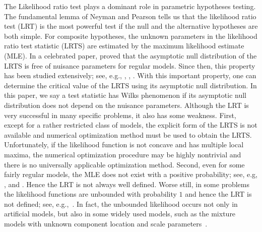\documentclass[11pt]{article}
\theoremstyle{plain}
\theoremstyle{definition}
\theoremstyle{remark}
\begin{document}
The Likelihood ratio test plays a dominant role in parametric hypotheses testing.
The fundamental lemma of Neyman and Pearson tells us that the likelihood ratio test (LRT) is the most powerful test if the null and the alternative hypotheses are both simple.
For composite hypotheses, the unknown parameters in the likelihood ratio test statistic (LRTS) are estimated by the maximum likelihood estimate (MLE).
In a celebrated paper, \citep{Wilks1938The} proved that the asymptotic null distribution of the LRTS is free of nuisance parameters for regular models.
Since then, this property has been studied extensively; see, e.g., \cite{Hogg1956On}, \cite{Fan2000}, \cite{Fan2001}.
With this important property, one can determine the critical value of the LRTS using its asymptotic null distribution.
In this paper, we say a test statistic has Wilks phenomenon if its asymptotic null distribution does not depend on the nuisance parameters.
Although the LRT is very successful in many specific problems,
it also has some weakness.
First, except for a rather restricted class of models, the explicit form of the LRTS is not available and numerical optimization method must be used to obtain the LRTS.
Unfortunately, if the likelihood function is not concave and has multiple local maxima,
the numerical optimization procedure may be highly nontrivial and there is no universally applicable optimization method.
Second, even for some fairly regular models,
the MLE does not exist with a positive probability; see, e.g, \cite{Fienberg2012}, \cite{Rinaldo2013} and \cite{Candes2020The_phase}.
Hence the LRT is not always well defined.
Worse still, in some problems the likelihood functions are unbounded with probability $1$ and hence the LRT is not defined; see, e.g.,~\cite{Cam1990Maximum}.
In fact, the unbounded likelihood occurs not only in artificial models, but also in some widely used models, such as the mixture models with unknown component location and scale parameters~\citep{chenjiahua2017}.
\end{document}
